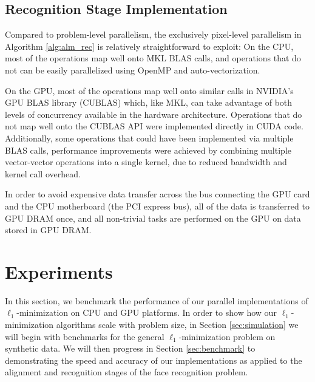 \subsection{Recognition Stage Implementation} 
Compared to problem-level
parallelism, the exclusively pixel-level parallelism in Algorithm \ref{alg:alm_rec} is
relatively straightforward to exploit:  
On the CPU, most of the operations map
well onto MKL BLAS calls, and operations that do not can be easily
parallelized using OpenMP and auto-vectorization.

On the GPU, most of the operations map well onto similar calls in NVIDIA's GPU
BLAS library (CUBLAS) which, like MKL, can take advantage of both levels of
concurrency available in the hardware architecture.  Operations that do not map
well onto the CUBLAS API were implemented directly in CUDA code.
Additionally, some operations that could have been implemented via multiple
BLAS calls, performance improvements were achieved by combining multiple
vector-vector operations into a single kernel, due to reduced bandwidth and
kernel call overhead.  

In order to avoid expensive data transfer across the bus connecting the GPU
card and the CPU motherboard (the PCI express bus), all of the data is
transferred to GPU DRAM once, and all non-trivial tasks are performed on the
GPU on data stored in GPU DRAM.  

\section{Experiments} 
\label{sec:experiment} 
In this section, we benchmark the
performance of our parallel implementations of $\ell_1$-minimization on CPU and GPU
platforms.  In order to show how our $\ell_1$-minimization algorithms scale with problem
size, in Section \ref{sec:simulation} we will begin with benchmarks for the
general $\ell_1$-minimization problem on synthetic data.  We will then progress in
Section \ref{sec:benchmark} to demonstrating the speed and accuracy of our
implementations as applied to the alignment and recognition stages of the face
recognition problem.

